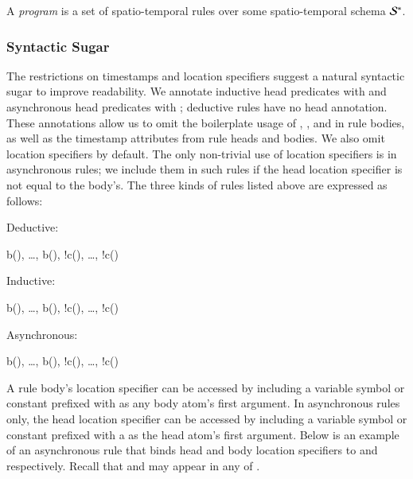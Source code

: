A \lang \emph{program} is a set of spatio-temporal rules over some
spatio-temporal schema $\stschema$.  

\subsubsection{Syntactic Sugar}
The restrictions on timestamps and location specifiers suggest a natural
syntactic sugar to improve readability.  We annotate inductive head predicates
with  and asynchronous head predicates with ;
deductive rules have no head annotation.  These annotations allow us to omit
the boilerplate usage of , ,  and
 in rule bodies, as well as the timestamp attributes from rule
heads and bodies.  We also omit location specifiers by default. The only non-trivial use of location specifiers is in asynchronous rules; we include them in such rules if the head location specifier is not equal to the
body's.  The three kinds of rules listed above are expressed as follows:

Deductive:

\begin{Drules}
        {b(), \ldots, b(), !c(), \ldots, !c()}
\end{Drules}

Inductive:

\begin{Drules}
        {b(), \ldots, b(), !c(), \ldots, !c()}
\end{Drules}

Asynchronous:

\begin{Drules}
        {b(), \ldots, b(), !c(), \ldots, !c()}
\end{Drules}

A rule body's location specifier can be accessed by including a variable symbol
or constant prefixed with \dedalus{#} as any body atom's first argument.  In
asynchronous rules only, the head location specifier can be accessed by
including a variable symbol or constant prefixed with a \dedalus{#} as the head
atom's first argument.  Below is an example of an asynchronous rule that binds
head and body location specifiers to  and  respectively.
Recall that  and  may appear in any of .

